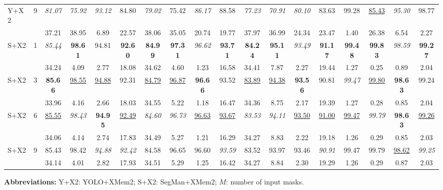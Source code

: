 \documentclass[preprint,12pt]{elsarticle}
\begin{document}
\begin{table}[!htbp]
\begin{tabular}{lccccccccccccccccc}
\rowcolor{gray!12}
Y+X2 & 9 & \textit{81.07} & \textit{75.92} & \textit{93.12} & 84.80 & \textit{79.02} & 75.42 & \textit{86.17} & 88.58 & \textit{77.23} & \textit{70.91} & \textit{80.10} & 83.63 & 99.28  & \uline{85.43} & \textit{95.30} & 98.77 \\\rowcolor{gray!12}
& &  37.21 &  38.95 & 6.89 & 22.57 & 38.06 & 35.05 &  20.74 & 19.77 & 37.97 & 36.99 & 24.34 & 23.47 & 1.40 & 26.38 & 6.54 & 2.27 \\\addlinespace[3pt]

\midrule
S+X2 & 1 & \textit{85.44} & \textbf{98.61} & 94.81 & \textbf{92.60} & \textbf{84.99} & \textbf{97.31} & \textit{96.62} & \textbf{93.71} & \textbf{84.24} & \textbf{95.11} & \textit{93.49} & \textbf{91.17} & \textbf{99.48} & \textbf{99.83} & \textit{98.59} & \textbf{99.27} \\
& & 34.24 & 4.09 & 2.77 & 18.08 & 34.62 & 4.60 & 1.23 & 16.58 & 34.41 & 7.87 & 2.27 & 19.44 & 1.27 & 0.25 & 0.89 & 2.04 \\\addlinespace[3pt]

\rowcolor{gray!12}
S+X2 & 3 & \textbf{85.66} & \uline{98.55} & \uline{94.88} & 92.31 & \uline{84.79} & \uline{96.87} & \textbf{96.66} & 93.52 & \uline{83.89} & \uline{94.38} & \textbf{93.56} & 90.81 & \textit{99.47} & \uline{99.80} & \textbf{98.63} & 99.24 \\\rowcolor{gray!12}
& & 33.96 & 4.16 & 2.66 & 18.03 & 34.55 & 5.22 & 1.18 & 16.47 & 34.36 & 8.75 & 2.17 & 19.39 & 1.27 & 0.28 & 0.85 & 2.04 \\\addlinespace[3pt]

S+X2 & 6 & \uline{85.55} & \textit{98.43} & \textbf{94.95} & \uline{92.49} & \textit{84.60} & \textit{96.73} & \uline{96.63} & \uline{93.67} & \textit{83.53} & \textit{94.11} & \uline{93.50} & \uline{91.00} & \uline{99.47} & \textit{99.79} & \textbf{98.63} & \uline{99.26} \\
& & 34.06 & 4.14 & 2.74 & 17.83 & 34.49 & 5.27 & 1.21 & 16.29 & 34.27 & 8.83 & 2.22 & 19.18 & 1.26 & 0.29 & 0.85 & 2.03 \\\addlinespace[3pt]

\rowcolor{gray!12}
S+X2 & 9 & 85.43 & 98.42 & \textit{94.88} & \textit{92.42} & 84.58 & 96.65 & 96.60 & \textit{93.59} & 83.52 & 93.97 & 93.46 & \textit{90.91} & 99.47 & 99.79 & \uline{98.62} & \textit{99.25} \\\rowcolor{gray!12}
& & 34.14 & 4.01 & 2.82 & 17.93 & 34.51 & 5.29 & 1.25 & 16.42 & 34.27 & 8.84 & 2.30 & 19.29 & 1.26 & 0.29 & 0.87 & 2.03 \\

\bottomrule
\end{tabular}

\vspace{2mm}
\scriptsize
\raggedright
\textbf{Abbreviations:}
Y+X2: YOLO+XMem2; S+X2: SegMan+XMem2;  
$M$: number of input masks.
\end{table}
\end{document}
